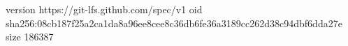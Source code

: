 version https://git-lfs.github.com/spec/v1
oid sha256:08cb187f25a2ca1da8a96ee8cee8c36db6fe36a3189cc262d38c94dbf6dda27e
size 186387
